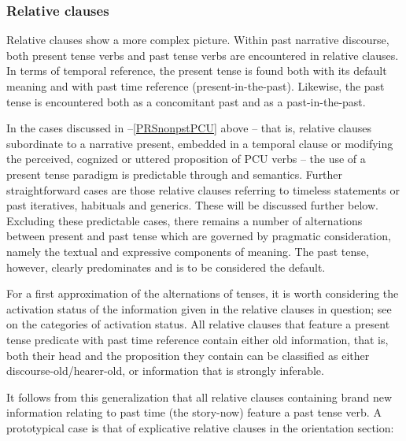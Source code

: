 \subsubsection{Relative clauses}\label{PRSnonPSTRelativeClauses}
Relative clauses show a more complex picture. Within past narrative discourse, both present tense verbs and past tense verbs are encountered in relative clauses. In terms of temporal reference, the present tense is found both with its default meaning and with past time reference (present-in-the-past). Likewise, the past tense is encountered both as a concomitant past and as a past-in-the-past.

In the cases discussed in --\ref{PRSnonpstPCU} above -- that is, relative clauses subordinate to a narrative present, embedded in a temporal clause or modifying the perceived, cognized or uttered proposition of PCU verbs -- the use of a present tense paradigm is predictable through  and semantics. Further straightforward cases are those relative clauses referring to timeless statements or past iteratives, habituals and generics. These will be discussed further below. Excluding these predictable cases, there remains a number of alternations between present and past tense which are governed by pragmatic consideration, namely the textual and expressive components of meaning. The past tense, however, clearly predominates and is to be considered the default.

For a first approximation of the alternations of tenses, it is worth considering the activation status of the information given in the relative clauses in question; see  on the categories of activation status.  All relative clauses that feature a present tense predicate with past time reference contain either old information, that is, both their head and the proposition they contain can be classified as either discourse-old/hearer-old, or information that is strongly inferable.

It follows from this generalization that all relative clauses containing brand new information relating to past time (the story-now) feature a past tense verb. A prototypical case is that of explicative relative clauses in the orientation section:

